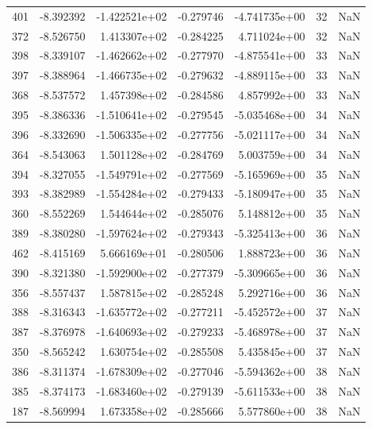 \begin{tabular}{rrrrrrr}
 401 &  -8.392392 & -1.422521e+02 & -0.279746 & -4.741735e+00 &          32 & NaN \\
 372 &  -8.526750 &  1.413307e+02 & -0.284225 &  4.711024e+00 &          32 & NaN \\
 398 &  -8.339107 & -1.462662e+02 & -0.277970 & -4.875541e+00 &          33 & NaN \\
 397 &  -8.388964 & -1.466735e+02 & -0.279632 & -4.889115e+00 &          33 & NaN \\
 368 &  -8.537572 &  1.457398e+02 & -0.284586 &  4.857992e+00 &          33 & NaN \\
 395 &  -8.386336 & -1.510641e+02 & -0.279545 & -5.035468e+00 &          34 & NaN \\
 396 &  -8.332690 & -1.506335e+02 & -0.277756 & -5.021117e+00 &          34 & NaN \\
 364 &  -8.543063 &  1.501128e+02 & -0.284769 &  5.003759e+00 &          34 & NaN \\
 394 &  -8.327055 & -1.549791e+02 & -0.277569 & -5.165969e+00 &          35 & NaN \\
 393 &  -8.382989 & -1.554284e+02 & -0.279433 & -5.180947e+00 &          35 & NaN \\
 360 &  -8.552269 &  1.544644e+02 & -0.285076 &  5.148812e+00 &          35 & NaN \\
 389 &  -8.380280 & -1.597624e+02 & -0.279343 & -5.325413e+00 &          36 & NaN \\
 462 &  -8.415169 &  5.666169e+01 & -0.280506 &  1.888723e+00 &          36 & NaN \\
 390 &  -8.321380 & -1.592900e+02 & -0.277379 & -5.309665e+00 &          36 & NaN \\
 356 &  -8.557437 &  1.587815e+02 & -0.285248 &  5.292716e+00 &          36 & NaN \\
 388 &  -8.316343 & -1.635772e+02 & -0.277211 & -5.452572e+00 &          37 & NaN \\
 387 &  -8.376978 & -1.640693e+02 & -0.279233 & -5.468978e+00 &          37 & NaN \\
 350 &  -8.565242 &  1.630754e+02 & -0.285508 &  5.435845e+00 &          37 & NaN \\
 386 &  -8.311374 & -1.678309e+02 & -0.277046 & -5.594362e+00 &          38 & NaN \\
 385 &  -8.374173 & -1.683460e+02 & -0.279139 & -5.611533e+00 &          38 & NaN \\
 187 &  -8.569994 &  1.673358e+02 & -0.285666 &  5.577860e+00 &          38 & NaN \\

\end{tabular}
